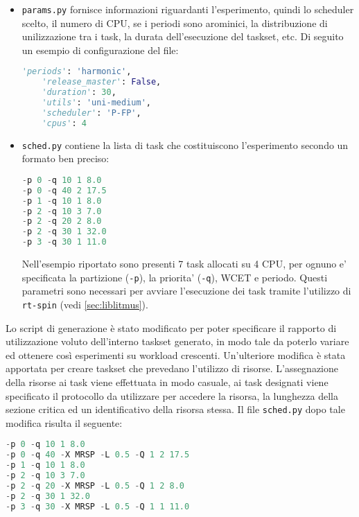 \begin{appendices}
\begin{itemize}
	\item \texttt{params.py} fornisce informazioni riguardanti l'esperimento, quindi lo scheduler scelto, il numero di CPU, se i periodi sono arominici, la distribuzione di unilizzazione tra i task, la durata dell'esecuzione del taskset, etc. Di seguito un esempio di configurazione del file:\\

 \begin{lstlisting}[frame=single,language=Python]  % Start your code-block
	'periods': 'harmonic',
	'release_master': False,
	'duration': 30,
 	'utils': 'uni-medium',
 	'scheduler': 'P-FP',
 	'cpus': 4
\end{lstlisting}

	\item \texttt{sched.py} contiene la lista di task che costituiscono l'esperimento secondo un formato ben preciso: \\

 \begin{lstlisting}[frame=single,language=Python]  % Start your code-block
-p 0 -q 10 1 8.0
-p 0 -q 40 2 17.5
-p 1 -q 10 1 8.0
-p 2 -q 10 3 7.0
-p 2 -q 20 2 8.0
-p 2 -q 30 1 32.0
-p 3 -q 30 1 11.0
\end{lstlisting}

Nell'esempio riportato sono presenti 7 task allocati su 4 CPU, per ognuno e' specificata la partizione (\texttt{-p}), la priorita' (\texttt{-q}), WCET e periodo. Questi parametri sono necessari per avviare l'esecuzione dei task tramite l'utilizzo di \texttt{rt-spin} (vedi \ref{sec:liblitmus}).

 \end{itemize}

 \noindent Lo script di generazione è stato modificato per poter specificare il rapporto di utilizzazione voluto dell'interno taskset generato, in modo tale da poterlo variare ed ottenere così esperimenti su workload crescenti. Un'ulteriore modifica è stata apportata per creare taskset che prevedano l'utilizzo di risorse. L'assegnazione della risorse ai task viene effettuata in modo casuale, ai task designati viene specificato il protocollo da utilizzare per accedere la risorsa, la lunghezza della sezione critica ed un identificativo della risorsa stessa. Il file \texttt{sched.py} dopo tale modifica risulta il seguente:\\

 \begin{lstlisting}[frame=single,language=Python]  % Start your code-block
-p 0 -q 10 1 8.0
-p 0 -q 40 -X MRSP -L 0.5 -Q 1 2 17.5
-p 1 -q 10 1 8.0
-p 2 -q 10 3 7.0
-p 2 -q 20 -X MRSP -L 0.5 -Q 1 2 8.0
-p 2 -q 30 1 32.0
-p 3 -q 30 -X MRSP -L 0.5 -Q 1 1 11.0
\end{lstlisting}


\end{appendices}
